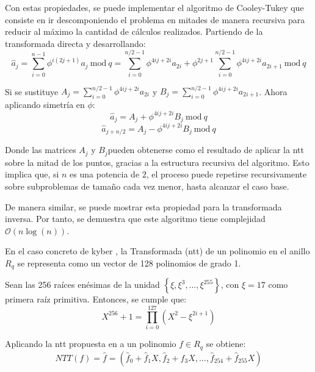 Con estas propiedades, se puede implementar el algoritmo de Cooley-Tukey \cite{CooleyALG} que consiste en ir descomponiendo el problema en mitades de manera recursiva para reducir al máximo la cantidad de cálculos realizados. Partiendo de la transformada directa y desarrollando:
\begin{equation}
	\hat{a}_j=\sum_{i=0}^{n-1} \phi^{i\left(2j+1\right)} a_j \ \text{mod} \ q = \sum_{i=0}^{n/2-1} \phi^{4ij+2i} a_{2i} + \phi^{2j+1} \sum_{i=0}^{n/2-1} \phi^{4ij+2i} a_{2i+1} \ \text{mod} \ q
\end{equation}

Si se sustituye \(A_j=\sum_{i=0}^{n/2-1} \phi^{4ij+2i} a_{2i}\) y \(B_j=\sum_{i=0}^{n/2-1} \phi^{4ij+2i} a_{2i+1}\). Ahora aplicando simetría en \(\phi\):
\begin{equation}
	\hat{a}_j=A_j+\phi^{4ij+2i}B_j  \ \text{mod} \ q
\end{equation}
\begin{equation}
	\hat{a}_{j+n/2}=A_j-\phi^{4ij+2i}B_j  \ \text{mod} \ q
\end{equation}

Donde las matrices \(A_j\) y \(B_j\)pueden obtenerse como el resultado de aplicar la \gls{ntt} sobre la mitad de los puntos, gracias a la estructura recursiva del algoritmo. Esto implica que, si \(n\) es una potencia de \(2\), el proceso puede repetirse recursivamente sobre subproblemas de tamaño cada vez menor, hasta alcanzar el caso base. 
\newline

De manera similar, se puede mostrar esta propiedad para la transformada inversa. Por tanto, se demuestra que este algoritmo tiene complejidad \(\mathcal{O}(n \log(n))\).
\newline

En el caso concreto de kyber \cite{kyber-spec-2021}, la Transformada (\gls{ntt}) de un polinomio en el anillo \(R_q\) se representa como un vector de 128 polinomios de grado 1.
\newline

Sean las 256 raíces enésimas de la unidad \(\left\{\xi, \xi^3, \dots, \xi^{255}\right\}\), con \(\xi = 17\) como primera raíz primitiva. Entonces, se cumple que:
\begin{equation}
	X^{256}+1=\prod_{i=0}^{127}\left(X^2- \xi^{2i+1}\right)
\end{equation}

Aplicando la \gls{ntt} propuesta en \cite{kyber-spec-2021} a un polinomio \(f\in R_q\) se obtiene:
\begin{equation}
	NTT(f)=\hat{f}=\left(\hat{f}_0+\hat{f}_1X,\hat{f}_2+\hat{f}_3X,...,\hat{f}_{254}+\hat{f}_{255}X\right)
\end{equation}

